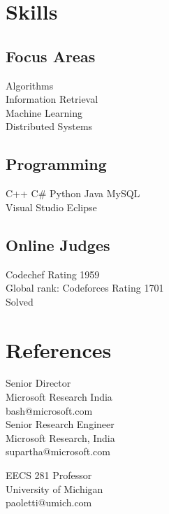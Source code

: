 \documentclass[]{resume-openfont}
\begin{document}
\begin{minipage}[t]{0.30\textwidth}
\section{Skills}
\subsection{Focus Areas}
\textbullet{} Algorithms \\
\textbullet{} Information Retrieval \\
\textbullet{} Machine Learning \\
\textbullet{} Distributed Systems \\
\sectionsep

\subsection{Programming}
C++ \textbullet{}   C\# \textbullet{} Python \textbullet{} Java \textbullet{} MySQL \\
Visual Studio \textbullet{} Eclipse \\

\sectionsep

\subsection{Online Judges}
Codechef 
Rating 1959 \\
Global rank: 
Codeforces Rating 1701 \\
Solved 
\sectionsep

\section{References}
Senior Director \\
Microsoft Research India \\
bash@microsoft.com \\

\sectionsep
{}
Senior Research Engineer \\
Microsoft Research, India \\
supartha@microsoft.com

\sectionsep
{}
EECS 281 Professor  \\
University of Michigan \\
paoletti@umich.com
%
%

\end{minipage} 
\end{document}
